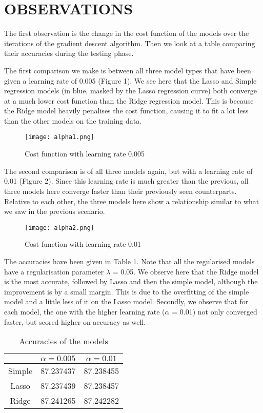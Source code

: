 \documentclass[letterpaper, 10 pt, conference]{ieeeconf}  %
\begin{document}
\section{OBSERVATIONS}
The first observation is the change in the cost function of the models over the iterations of the gradient descent algorithm. Then we look at a table comparing their accuracies during the testing phase.

The first comparison we make is between all three model types that have been given a learning rate of 0.005 (Figure 1). We see here that the Lasso and Simple regression models (in blue, masked by the Lasso regression curve) both converge at a much lower cost function than the Ridge regression model. This is because the Ridge model heavily penalises the cost function, causing it to fit a lot less than the other models on the training data.

\begin{figure}[H]
\texttt{[image: alpha1.png]}
\caption{Cost function with learning rate 0.005}
\end{figure}

The second comparison is of all three models again, but with a learning rate of 0.01 (Figure 2). Since this learning rate is much greater than the previous, all three models here converge faster than their previously seen counterparts. Relative to each other, the three models here show a relationship similar to what we saw in the previous scenario.

\begin{figure}[H]
\texttt{[image: alpha2.png]}
\caption{Cost function with learning rate 0.01}
\end{figure}

The accuracies have been given in Table 1. Note that all the regularised models have a regularisation parameter $\lambda$ = 0.05. We observe here that the Ridge model is the most accurate, followed by Lasso and then the simple model, although the improvement is by a small margin. This is due to the overfitting of the simple model and a little less of it on the Lasso model. Secondly, we observe that for each model, the one with the higher learning rate ($\alpha$ = 0.01) not only converged faster, but scored higher on accuracy as well.

\begin{table}[H]
\caption{Accuracies of the models}
\label{model_accuracy}
\begin{center}
\begin{tabular}{|c||c|c|}
\hline
& $\alpha = 0.005$ & $\alpha = 0.01$ \\
\hline\hline
Simple & 87.237437 & 87.238455 \\
Lasso & 87.237439 & 87.238457 \\
Ridge & 87.241265 & 87.242282 \\
\hline
\end{tabular}
\end{center}
\end{table}
\end{document}
